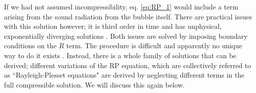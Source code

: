 \documentclass[prb,aps,nofootinbib,superscriptaddress,floatfix]{revtex4-2}
\begin{document}
If we had not assumed incompressibility, eq. \ref{eq:RP_1} would include a term arising from the sound radiation from the bubble itself. There are practical issues with this solution however; it is third order in time and has unphysical, exponentially diverging solutions \cite{prosperetti1999old,brenner2002single,prosperetti1986bubble,lezzi1987bubble}. Both issues are solved by imposing boundary conditions on the $\ddot{R}$ term. The procedure is difficult and apparently no unique way to do it exists \cite{prosperetti1986bubble,prosperetti1988nonlinear,keller1956damping}. Instead, there is a whole family of solutions that can be derived; different variations of the RP equation, which are collectively referred to as ``Rayleigh-Plesset equations" are derived by neglecting different terms in the full compressible solution. We will discuss this again below.
\end{document}
